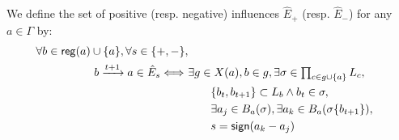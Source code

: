 \begin{proposition}\label{pps:inference-edges}
We define the set of positive (resp. negative) influences $\hat{E}_+$ (resp. $\hat{E}_-$) for any $a\in\Gamma$ by:
\begin{align}
\begin{split}\label{eq:edges-inference}
  \forall b\in\PHpredecgene{a} \cup \{ a \}, \forall s \in \{ +, - \}, \\
  b \xrightarrow{t+1} a \in \hat{E}_s \Longleftrightarrow\ & \exists g \in X(a), b \in g,
  \exists \sigma \in \textstyle\prod_{c\in g \cup \{ a \}} \PHl_c, \\
    &\qquad \{ b_t, b_{t+1} \} \subset \PHl_b \wedge b_t \in \sigma,\\
    &\qquad \exists a_j \in \irB_a(\sigma), \exists a_k \in \irB_a(\sigma\{b_{t+1}\}), \\
    &\qquad s = \f{sign}(a_k - a_j)
\end{split}\\
%
%
%
%

\end{align}
\end{proposition}
